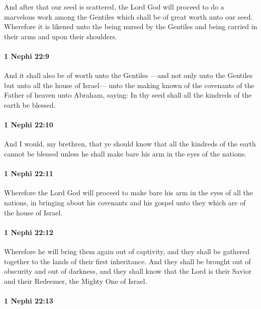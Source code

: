 			And after that our seed is scattered,
			the Lord God will proceed to do a marvelous work among the Gentiles
			which shall be of great worth unto our seed.
			Wherefore it is likened unto the being nursed by the Gentiles
			and being carried in their arms and upon their shoulders.

		\paragraph{1 Nephi 22:9} %
			\label{1 Nephi-22-9}

			And it shall also be of worth unto the Gentiles
			—and not only unto the Gentiles but unto all the house of Israel—
			unto the making known of the covenants of the Father of heaven
			unto Abraham, saying:
			In thy seed shall all the kindreds of the earth be blessed.

		\paragraph{1 Nephi 22:10} %
			\label{1 Nephi-22-10}

			And I would, my brethren, that ye should know
			that all the kindreds of the earth cannot be blessed
			unless he shall make bare his arm in the eyes of the nations.

		\paragraph{1 Nephi 22:11} %
			\label{1 Nephi-22-11}

			Wherefore the Lord God will proceed to make bare his arm
			in the eyes of all the nations,
			in bringing about his covenants and his gospel unto they
			which are of the house of Israel.

		\paragraph{1 Nephi 22:12} %
			\label{1 Nephi-22-12}

			Wherefore he will bring them again out of captivity,
			and they shall be gathered together to the lands of their first inheritance.
			And they shall be brought out of obscurity and out of darkness,
			and they shall know that
			the Lord is their Savior and their Redeemer, the Mighty One of Israel.

		\paragraph{1 Nephi 22:13} %
			\label{1 Nephi-22-13}

